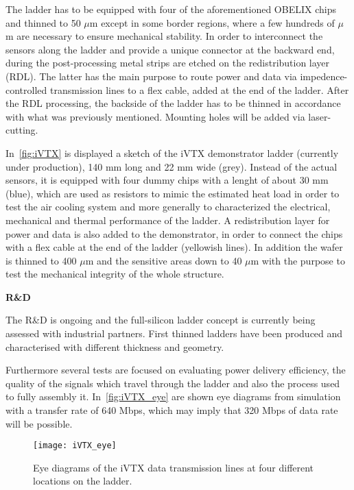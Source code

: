 The ladder has to be equipped with four of the aforementioned OBELIX chips and thinned to 50 $\mu$m except in some border regions, where a few hundreds of $\mu$m are necessary to ensure mechanical stability. 
In order to interconnect the sensors along the ladder and provide a unique connector at the backward end, during the post-processing metal strips are etched on the redistribution layer (RDL). The latter has the main purpose to route power and data via impedence-controlled transmission lines to a flex cable, added at the end of the ladder.
After the RDL processing, the backside of the ladder has to be thinned in accordance with what was previously mentioned. Mounting holes will be added via laser-cutting.


In~\autoref{fig:iVTX} is displayed a sketch of the iVTX demonstrator ladder (currently under production), 140 mm long and 22 mm wide (grey). Instead of the actual sensors, it is equipped with four dummy chips with a lenght of about 30 mm (blue), which are used as resistors to mimic the estimated heat load in order to test the air cooling system and more generally to characterized the electrical, mechanical and thermal performance of the ladder.
A redistribution layer for power and data is also added to the demonstrator, in order to connect the chips with a flex cable at the end of the ladder (yellowish lines). In addition the wafer is thinned to 400 $\mu$m and the sensitive areas down to 40 $\mu$m with the purpose to test the mechanical integrity of the whole structure.

\begin{description}
\item \textbf{R\&D}
\end{description}

The R\&D is ongoing and the full-silicon ladder concept is currently being assessed with industrial partners. First thinned ladders have been produced and characterised with different thickness and geometry.

Furthermore several tests are focused on evaluating power delivery efficiency, the quality of the signals which travel through the ladder and also the process used to fully assembly it. 
In~\autoref{fig:iVTX_eye} are shown eye diagrams from simulation with a transfer rate of 640 Mbps, which may imply that 320 Mbps of data rate will be possible.

\begin{figure}[h!]
\centering
\texttt{[image: iVTX\_eye]}
\caption{Eye diagrams of the iVTX data transmission lines at four different locations on the ladder.}
\label{fig:iVTX_eye}
\end{figure}

